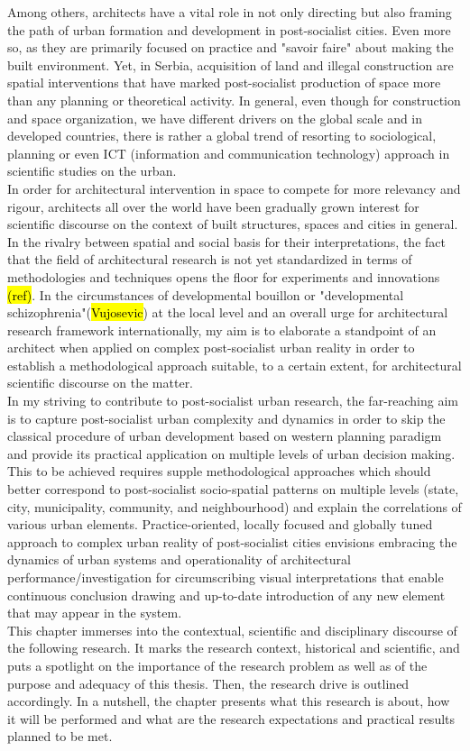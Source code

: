 \documentclass[11pt]{report}
\begin{document}
Among others, architects have a vital role in not only directing but also framing the path of urban formation and development in post-socialist cities. Even more so, as they are primarily focused on practice and "savoir faire" about making the built environment. Yet, in Serbia, acquisition of land and illegal construction are spatial interventions that have marked post-socialist production of space more than any planning or theoretical activity. In general, even though for construction and space organization, we have different drivers on the global scale and in developed countries, there is rather a global trend of resorting to sociological, planning or even ICT (information and communication technology) approach in scientific studies on the urban. 
\\
In order for architectural intervention in space to compete for more relevancy and rigour,  architects all over the world have been gradually grown interest for scientific discourse on the context of built structures, spaces and cities in general.  In the rivalry between spatial and social basis for their interpretations, the fact that the field of architectural research is not yet standardized in terms of methodologies and techniques opens the floor for experiments and innovations \hl{(ref)}. In the circumstances of developmental bouillon or "developmental schizophrenia"(\hl{Vujosevic}) at the local level and an overall urge for architectural research framework internationally, my aim is to elaborate a standpoint of an architect when applied on complex post-socialist urban reality in order to establish a methodological approach suitable, to a certain extent, for architectural scientific discourse on the matter.
\\
In my striving to contribute to post-socialist urban research, the far-reaching aim is to capture post-socialist urban complexity and dynamics in order to skip the classical procedure of urban development based on western planning paradigm and provide its practical application on multiple levels of urban decision making. This to be achieved requires supple methodological approaches which should better correspond to post-socialist socio-spatial patterns on multiple levels (state, city, municipality, community, and neighbourhood) and explain the correlations of various urban elements. Practice-oriented, locally focused and globally tuned approach to complex urban reality of post-socialist cities envisions embracing the dynamics of urban systems and operationality of architectural performance/investigation for circumscribing visual interpretations that enable continuous conclusion drawing and up-to-date introduction of any new element that may appear in the system.
\\
This chapter immerses into the contextual, scientific and disciplinary discourse of the following research. It marks the research context, historical and scientific, and puts a spotlight on the importance of the research problem as well as of the purpose and adequacy of this thesis. Then, the research drive is outlined accordingly. In a nutshell, the chapter presents what this research is about, how it will be performed and what are the research expectations and practical results planned to be met. 
\end{document}
